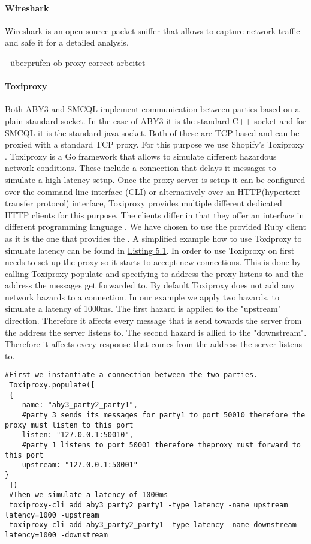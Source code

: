 \paragraph{Wireshark}
Wireshark \cite{wireshark} is an open source packet sniffer that allows to capture network traffic and safe it for a detailed analysis.      

- überprüfen ob proxy correct arbeitet

 \paragraph{Toxiproxy}
 Both ABY3 and SMCQL implement communication between parties based on a plain standard socket. In the case of ABY3 it is the standard C++ socket and for SMCQL it is the standard java socket. Both of these are TCP based and can be proxied with a standard TCP proxy. For this purpose we use Shopify's Toxiproxy \cite{toxiproxy}. Toxiproxy is a Go framework that allows to simulate different hazardous network conditions. These include a connection that delays it messages to simulate a high latency setup. Once the proxy server is setup it can be configured over the command line interface (CLI) or alternatively over an HTTP(hypertext transfer protocol) interface, Toxiproxy provides multiple different dedicated HTTP clients for this purpose. The clients differ in that they offer an interface in different programming language . We have chosen to use the provided Ruby client as it is the one that provides the  . 
 A simplified example how to use Toxiproxy to simulate latency can be found in \hyperref[the_label]{Listing 5.1}. In order to use Toxiproxy on first needs to set up the proxy so it starts to accept new connections. This is done by calling Toxiproxy populate and specifying to address the proxy listens to and the address the messages get forwarded to.
 By default Toxiproxy does not add any network hazards to a connection. In our example we apply two hazards, to simulate a latency of 1000ms. The first hazard is applied to the "upstream" direction. Therefore it affects every message that is send towards the server from the address the server listens to. The second hazard is allied to the "downstream". Therefore it affects every response that comes from the address the server listens to.    
 
 \label{Toxi_label}				
 \begin{lstlisting}[caption={Setting up a proxy that simulates latency between two parties with Toxiporxy}]
 #First we instantiate a connection between the two parties. 
 Toxiproxy.populate([
 {
 	name: "aby3_party2_party1",
 	#party 3 sends its messages for party1 to port 50010 therefore the proxy must listen to this port
 	listen: "127.0.0.1:50010",   
 	#party 1 listens to port 50001 therefore theproxy must forward to this port
 	upstream: "127.0.0.1:50001"  
}
 ])
 #Then we simulate a latency of 1000ms 
 toxiproxy-cli add aby3_party2_party1 -type latency -name upstream latency=1000 -upstream
 toxiproxy-cli add aby3_party2_party1 -type latency -name downstream latency=1000 -downstream
 
 \end{lstlisting}
